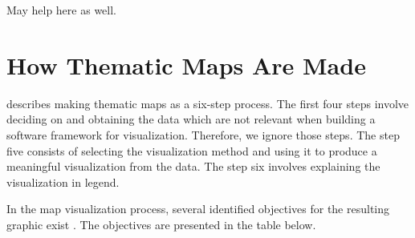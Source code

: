 \citet[p.~16]{tufte_visual_1986} May help here as well.

\section{How Thematic Maps Are Made}
\citet{schlichtmann_visualization_2002} describes making thematic maps as a six-step process. The first four steps involve deciding on and obtaining the data which are not relevant when building a software framework for visualization. Therefore, we ignore those steps. The step five consists of selecting the visualization method and using it to produce a meaningful visualization from the data. The step six involves explaining the visualization in legend. 

In the map visualization process, several identified objectives for the resulting graphic exist \citep{schlichtmann_visualization_2002}. The objectives are presented in the table below.

